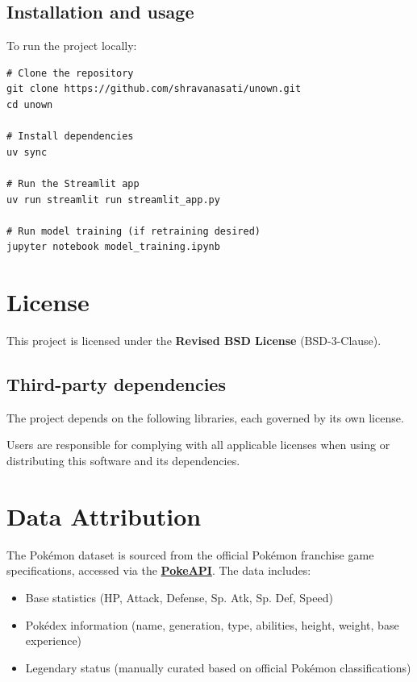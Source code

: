 \subsection{Installation and usage}

To run the project locally:

\begin{verbatim}
# Clone the repository
git clone https://github.com/shravanasati/unown.git
cd unown

# Install dependencies
uv sync

# Run the Streamlit app
uv run streamlit run streamlit_app.py

# Run model training (if retraining desired)
jupyter notebook model_training.ipynb
\end{verbatim}

\section{License}
\label{app:license}

This project is licensed under the \textbf{Revised BSD License} (BSD-3-Clause). 

\subsection{Third-party dependencies}

The project depends on the following libraries, each governed by its own license.

Users are responsible for complying with all applicable licenses when using or distributing this software and its dependencies.

\section{Data Attribution}
\label{app:data_attribution}

The Pokémon dataset is sourced from the official Pokémon franchise game specifications, accessed via the \href{https://pokeapi.co}{\textbf{PokeAPI}}. The data includes:
\begin{itemize}
  \item Base statistics (HP, Attack, Defense, Sp. Atk, Sp. Def, Speed)
  \item Pokédex information (name, generation, type, abilities, height, weight, base experience)
  \item Legendary status (manually curated based on official Pokémon classifications)
\end{itemize}

